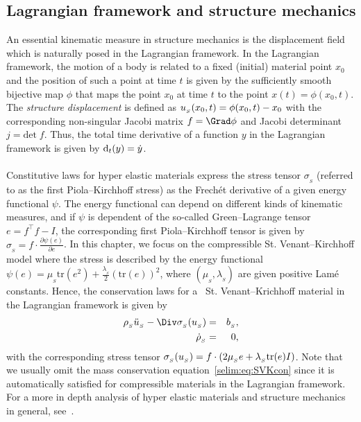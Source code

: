 \subsection{ Lagrangian framework and structure mechanics}

An essential kinematic measure in structure mechanics is the
displacement field which is naturally posed in the Lagrangian
framework.  In the Lagrangian framework, the motion of a body is
related to a fixed (initial) material point $x_0$ and the position of
such a point at time $t$ is given by the sufficiently smooth bijective
map $\phi$ that maps the point $x_0$ at time $t$ to the point $x(t)=
\phi(x_0,t)$. The \emph{structure displacement} is defined as
$u_{_{S}}(x_0,t) = \phi(x_0, t) - x_0$ with the corresponding non-singular
Jacobi matrix $f = \Grad\phi$ and Jacobi determinant $j =
\textrm{det}\; f$. Thus, the total time derivative of a function $y$
in the Lagrangian framework is given by $\textrm{d}_t(y) = \dot{y}$.
\\\\
Constitutive laws for hyper elastic materials express the stress
tensor $\sigma_{_{S}}$ (referred to as the first Piola--Kirchhoff
stress) as the Frech\'{e}t derivative of a given energy functional
$\psi$.  The energy functional can depend on different kinds of
kinematic measures, and if $\psi$ is dependent of the so-called
Green--Lagrange tensor $e= f^{\top}f -I$, the corresponding first
Piola--Kirchhoff tensor is given by $\sigma_{_{S}} =
f\cdot\frac{\partial \psi(e)}{\partial e}$. In this chapter, we focus
on the compressible St. Venant--Kirchhoff model where the stress is
described by the energy functional $\psi(e) =
\mu_{_{S}}\textrm{tr}(e^2) +
\frac{\lambda_{_{S}}}{2}(\textrm{tr}(e))^2$, where
$(\mu_{_{S}},\lambda_{_{S}})$ are given positive Lam\'{e}
constants. Hence, the conservation laws for a ~St. Venant--Krichhoff
material in the Lagrangian framework is given by
\begin{eqnarray}
\label{selim:eq:SVKmom}
\rhoS \ddotuS - \Div\sigmaS(\uS) &=& b_{_{S}}, \\
\label{selim:eq:SVKcon}
\dot{\rho}_{_{S}}&=&0,
\end{eqnarray}
with the corresponding stress tensor $\sigma_{_{S}}(u_{_{S}}) =
f\cdot(2\mu_{_{S}}e + \lambda_{_{S}} \textrm{tr}(e)I)$.  Note that we
usually omit the mass conservation equation~\eqref{selim:eq:SVKcon}
since it is automatically satisfied for compressible materials in the
Lagrangian framework.  For a more in depth analysis of hyper elastic
materials and structure mechanics in general, see~\cite{Gurtin1981,
  Holzapfel2000, Narayanan2007}.

